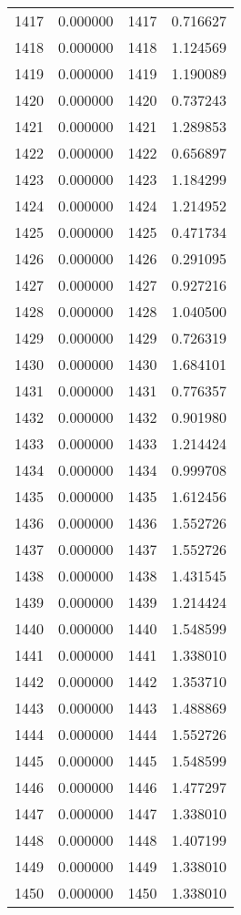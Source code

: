 \documentclass[12pt]{article}
\begin{document}
\begin{longtable}{@{}cccc@{}}
1417 & 0.000000 & 1417 & 0.716627 \\
1418 & 0.000000 & 1418 & 1.124569 \\
1419 & 0.000000 & 1419 & 1.190089 \\
1420 & 0.000000 & 1420 & 0.737243 \\
1421 & 0.000000 & 1421 & 1.289853 \\
1422 & 0.000000 & 1422 & 0.656897 \\
1423 & 0.000000 & 1423 & 1.184299 \\
1424 & 0.000000 & 1424 & 1.214952 \\
1425 & 0.000000 & 1425 & 0.471734 \\
1426 & 0.000000 & 1426 & 0.291095 \\
1427 & 0.000000 & 1427 & 0.927216 \\
1428 & 0.000000 & 1428 & 1.040500 \\
1429 & 0.000000 & 1429 & 0.726319 \\
1430 & 0.000000 & 1430 & 1.684101 \\
1431 & 0.000000 & 1431 & 0.776357 \\
1432 & 0.000000 & 1432 & 0.901980 \\
1433 & 0.000000 & 1433 & 1.214424 \\
1434 & 0.000000 & 1434 & 0.999708 \\
1435 & 0.000000 & 1435 & 1.612456 \\
1436 & 0.000000 & 1436 & 1.552726 \\
1437 & 0.000000 & 1437 & 1.552726 \\
1438 & 0.000000 & 1438 & 1.431545 \\
1439 & 0.000000 & 1439 & 1.214424 \\
1440 & 0.000000 & 1440 & 1.548599 \\
1441 & 0.000000 & 1441 & 1.338010 \\
1442 & 0.000000 & 1442 & 1.353710 \\
1443 & 0.000000 & 1443 & 1.488869 \\
1444 & 0.000000 & 1444 & 1.552726 \\
1445 & 0.000000 & 1445 & 1.548599 \\
1446 & 0.000000 & 1446 & 1.477297 \\
1447 & 0.000000 & 1447 & 1.338010 \\
1448 & 0.000000 & 1448 & 1.407199 \\
1449 & 0.000000 & 1449 & 1.338010 \\
1450 & 0.000000 & 1450 & 1.338010 \\

\end{longtable}
\end{document}
